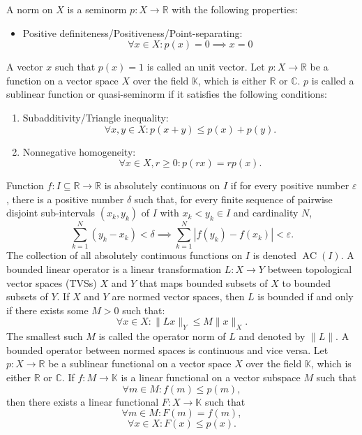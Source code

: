 \documentclass[a4paper,12pt]{report}
\begin{document}
A norm on $X$ is a seminorm $p\colon X\to\mathbb{R}$ with the following properties:
\begin{itemize}
\item Positive definiteness/Positiveness/Point-separating: \[\forall x\in X\colon p(x)=0\implies x=0\]
\end{itemize}
A vector $x$ such that $p(x)=1$ is called an unit vector.
Let $p\colon X\to\mathbb{R}$ be a function on a vector space $X$ over the field $\mathbb{K}$, which is either $\mathbb{R}$ or $\mathbb{C}$. $p$ is called a sublinear function or quasi-seminorm if it satisfies the following conditions:
\begin{enumerate}
\item Subadditivity/Triangle inequality:\[\forall x,y\in X\colon p(x+y)\leq p(x)+p(y).\]
\item Nonnegative homogeneity: \[\forall x\in X,r\geq 0\colon p(rx)=rp(x).\]
\end{enumerate}
Function $f\colon I\subseteq\mathbb{R}\to\mathbb{R}$ is absolutely continuous on $I$ if for every positive number $\varepsilon$, there is a positive number $\delta$ such that, for every finite sequence of pairwise disjoint sub-intervals $(x_k,y_k)$ of $I$ with $x_k<y_k\in I$ and cardinality $N$,
\[\sum_{k=1}^N(y_k-x_k)<\delta\implies\sum_{k=1}^N|f(y_k)-f(x_k)|<\varepsilon.\]
The collection of all absolutely continuous functions on $I$ is denoted $\operatorname {AC} (I)$.
A bounded linear operator is a linear transformation $L\colon X\to Y$ between topological vector spaces (TVSs) $X$ and $Y$ that maps bounded subsets of $X$ to bounded subsets of $Y$. If $X$ and $Y$ are normed vector spaces, then $L$ is bounded if and only if there exists some $M>0$ such that:
\[\forall x\in X\colon \|Lx\|_Y\leq M\|x\|_X.\]
The smallest such $M$ is called the operator norm of $L$ and denoted by $\|L\|$. A bounded operator between normed spaces is continuous and vice versa.
Let $p\colon X\to\mathbb{R}$ be a sublinear functional on a vector space $X$ over the field $\mathbb{K}$, which is either $\mathbb{R}$ or $\mathbb{C}$. If $f\colon M\to\mathbb{K}$ is a linear functional on a vector subspace $M$ such that
\[\forall m\in M\colon f(m)\leq p(m),\]
then there exists a linear functional $F\colon X\to\mathbb{K}$ such that
\[\forall m\in M\colon F(m)=f(m),\]
\[\forall x\in X\colon F(x)\leq p(x).\]
\end{document}
